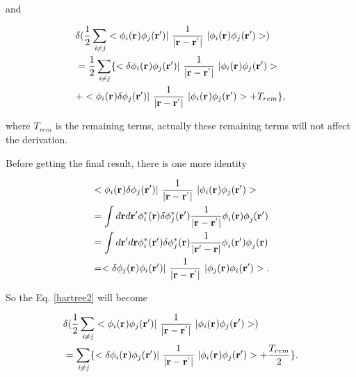 \documentclass[a4paper, 12pt, titlepage,oneside,drop]{kthesis}
\begin{document}
and 

\begin{equation}\begin{split}\label{hartree2}
&  \delta( \frac{1}{2} \suminj<i><j> <\bwf<i><> \bwfn<j><'>|\ \frac{1}{|\textbf{r} - \textbf{r}^{'} |} \ | \bwf<i><> \bwfn<j><'>>)   \\
& =   \frac{1}{2} \suminj<i><j> \{  <\delta \bwf<i><> \bwfn<j><'>|\ \frac{1}{|\textbf{r} - \textbf{r}^{'} |} \ | \bwf<i><> \bwfn<j><'>>  \\
& +   < \bwf<i><> \delta \bwfn<j><'>|\ \frac{1}{|\textbf{r} - \textbf{r}^{'} |} \ | \bwf<i><> \bwfn<j><'>> +  T_{rem}\},
\end{split}\end{equation}

where $T_{rem}$ is the remaining terms, actually these remaining terms will not affect the derivation.

Before getting the final result, there is one more identity 

\begin{equation}\begin{split}\label{hartreelabel1}
& < \bwf<i><> \delta \bwfn<j><'>|\ \frac{1}{|\textbf{r} - \textbf{r}^{'} |} \ | \bwf<i><> \bwfn<j><'>> \\
& = \int d \textbf{r} d \textbf{r}{'}  \phi_{i}^{*} (\textbf{r}{}) \delta \phi_{j}^{*} (\textbf{r}{'}) \frac{1}{|\textbf{r} - \textbf{r}^{'} |}  \phi_{i}^{} (\textbf{r}{})  \phi_{j}^{} (\textbf{r}{'})\\
& = \int d \textbf{r}{'} d \textbf{r}  \phi_{i}^{*} (\textbf{r}{'}) \delta \phi_{j}^{*} (\textbf{r}{}) \frac{1}{|\textbf{r}{'} - \textbf{r} |}  \phi_{i}^{} (\textbf{r}{'})  \phi_{j}^{} (\textbf{r})\\
& = <\delta \bwf<j><> \bwfn<i><'>|\ \frac{1}{|\textbf{r} - \textbf{r}^{'} |} \ | \bwf<j><> \bwfn<i><'>>.
\end{split}\end{equation}

\noindent So the Eq. \ref{hartree2} will become 

\begin{equation}\begin{split}\label{hartree3}
&  \delta( \frac{1}{2} \suminj<i><j> <\bwf<i><> \bwfn<j><'>|\ \frac{1}{|\textbf{r} - \textbf{r}^{'} |} \ | \bwf<i><> \bwfn<j><'>>)   \\
& =  \suminj<i><j> \{  <\delta \bwf<i><> \bwfn<j><'>|\ \frac{1}{|\textbf{r} - \textbf{r}^{'} |} \ | \bwf<i><> \bwfn<j><'>> + \frac{T_{rem}}{2}\}.
\end{split}\end{equation}
\end{document}
